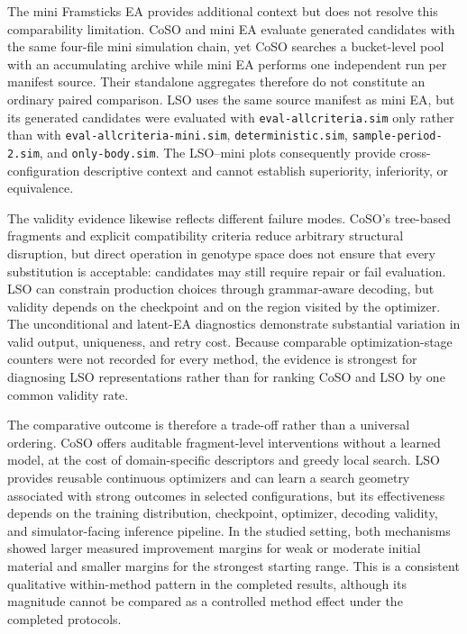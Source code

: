 The mini Framsticks EA provides additional context but does not resolve this comparability limitation. CoSO and mini EA evaluate generated candidates with the same four-file mini simulation chain, yet CoSO searches a bucket-level pool with an accumulating archive while mini EA performs one independent run per manifest source. Their standalone aggregates therefore do not constitute an ordinary paired comparison. LSO uses the same source manifest as mini EA, but its generated candidates were evaluated with \texttt{eval-allcriteria.sim} only rather than with \texttt{eval-allcriteria-mini.sim}, \texttt{deterministic.sim}, \texttt{sample-period-2.sim}, and \texttt{only-body.sim}. The LSO--mini plots consequently provide cross-configuration descriptive context and cannot establish superiority, inferiority, or equivalence.

The validity evidence likewise reflects different failure modes. CoSO's tree-based fragments and explicit compatibility criteria reduce arbitrary structural disruption, but direct operation in genotype space does not ensure that every substitution is acceptable: candidates may still require repair or fail evaluation. LSO can constrain production choices through grammar-aware decoding, but validity depends on the checkpoint and on the region visited by the optimizer. The unconditional and latent-EA diagnostics demonstrate substantial variation in valid output, uniqueness, and retry cost. Because comparable optimization-stage counters were not recorded for every method, the evidence is strongest for diagnosing LSO representations rather than for ranking CoSO and LSO by one common validity rate.

The comparative outcome is therefore a trade-off rather than a universal ordering. CoSO offers auditable fragment-level interventions without a learned model, at the cost of domain-specific descriptors and greedy local search. LSO provides reusable continuous optimizers and can learn a search geometry associated with strong outcomes in selected configurations, but its effectiveness depends on the training distribution, checkpoint, optimizer, decoding validity, and simulator-facing inference pipeline. In the studied setting, both mechanisms showed larger measured improvement margins for weak or moderate initial material and smaller margins for the strongest starting range. This is a consistent qualitative within-method pattern in the completed results, although its magnitude cannot be compared as a controlled method effect under the completed protocols.

